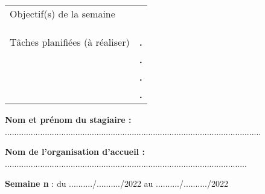 \documentclass[a4paper,11pt]{article}
\makeatletter
\newcommand{\mktitle}{\@maketitle}
\makeatother
\begin{document}
\begin{center}
\begin{tabular}{|C{6cm}|p{10.3cm}|}
	\hline
	\\
	\hline
	Objectif(s) de la semaine &\\&\\&\\&\\
	\hline
	Tâches planifiées (à réaliser) & \hspace{.2cm}\huge\textbf{.}\\&\hspace{.2cm}\huge\textbf{.}\\&\hspace{.2cm}\huge\textbf{.}\\& \hspace{.2cm}\huge\textbf{.}\\
	\hline
\end{tabular}
\end{center}\newpage

\mktitle\vspace{-.2cm}

\noindent\textbf{Nom et prénom du stagiaire :} .............................................................................................................\vspace{.4cm}

\noindent\textbf{Nom de l'organisation d'accueil :} .......................................................................................................\vspace{.4cm}

\noindent\textbf{Semaine n} : du ........../........../2022 au ........../........../2022\vspace{-.2cm}
\end{document}

